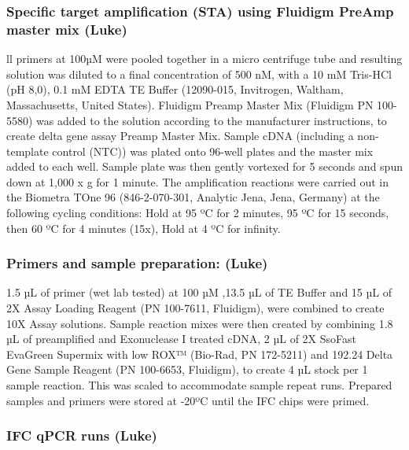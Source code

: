 \documentclass[webpdf,large,contemporary,namedate]{oup-authoring-template}
\theoremstyle{thmstyleone}
\theoremstyle{thmstyletwo}
\theoremstyle{thmstylethree}
\begin{document}
\hypertarget{specific-target-amplification-sta-using-fluidigm-preamp-master-mix-luke}{%
\subsubsection{Specific target amplification (STA) using Fluidigm PreAmp
master mix
(Luke)}\label{specific-target-amplification-sta-using-fluidigm-preamp-master-mix-luke}}

ll primers at 100µM were pooled together in a micro centrifuge tube and
resulting solution was diluted to a final concentration of 500 nM, with
a 10 mM Tris-HCl (pH 8,0), 0.1 mM EDTA TE Buffer (12090-015, Invitrogen,
Waltham, Massachusetts, United States). Fluidigm Preamp Master Mix
(Fluidigm PN 100-5580) was added to the solution according to the
manufacturer instructions, to create delta gene assay Preamp Master Mix.
Sample cDNA (including a non-template control (NTC)) was plated onto
96-well plates and the master mix added to each well. Sample plate was
then gently vortexed for 5 seconds and spun down at 1,000 x g for 1
minute. The amplification reactions were carried out in the Biometra
TOne 96 (846-2-070-301, Analytic Jena, Jena, Germany) at the following
cycling conditions: Hold at 95 ºC for 2 minutes, 95 ºC for 15 seconds,
then 60 ºC for 4 minutes (15x), Hold at 4 ºC for infinity.

\hypertarget{primers-and-sample-preparation-luke}{%
\subsubsection{Primers and sample preparation:
(Luke)}\label{primers-and-sample-preparation-luke}}

1.5 µL of primer (wet lab tested) at 100 µM ,13.5 µL of TE Buffer and 15
µL of 2X Assay Loading Reagent (PN 100-7611, Fluidigm), were combined to
create 10X Assay solutions. Sample reaction mixes were then created by
combining 1.8 µL of preamplified and Exonuclease I treated cDNA, 2 µL of
2X SsoFast EvaGreen Supermix with low ROX™ (Bio-Rad, PN 172-5211) and
192.24 Delta Gene Sample Reagent (PN 100-6653, Fluidigm), to create 4 µL
stock per 1 sample reaction. This was scaled to accommodate sample
repeat runs. Prepared samples and primers were stored at -20ºC until the
IFC chips were primed.

\hypertarget{ifc-qpcr-runs-luke}{%
\subsubsection{IFC qPCR runs (Luke)}\label{ifc-qpcr-runs-luke}}
\end{document}
